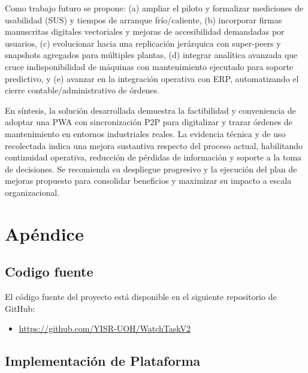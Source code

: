 \documentclass[10pt,a4paper]{report}
\begin{document}
Como trabajo futuro se propone: (a) ampliar el piloto y formalizar mediciones de usabilidad (SUS) y tiempos de arranque frío/caliente, (b) incorporar firmas manuscritas digitales vectoriales y mejoras de accesibilidad demandadas por usuarios, (c) evolucionar hacia una replicación jerárquica con super-peers y snapshots agregados para múltiples plantas, (d) integrar analítica avanzada que cruce indisponibilidad de máquinas con mantenimiento ejecutado para soporte predictivo, y (e) avanzar en la integración operativa con ERP, automatizando el cierre contable/administrativo de órdenes.

En síntesis, la solución desarrollada demuestra la factibilidad y conveniencia de adoptar una PWA con sincronización P2P para digitalizar y trazar órdenes de mantenimiento en entornos industriales reales. La evidencia técnica y de uso recolectada indica una mejora sustantiva respecto del proceso actual, habilitando continuidad operativa, reducción de pérdidas de información y soporte a la toma de decisiones. Se recomienda su despliegue progresivo y la ejecución del plan de mejoras propuesto para consolidar beneficios y maximizar su impacto a escala organizacional.


\appendix
\chapter*{Apéndice}
\section*{Codigo fuente}
El código fuente del proyecto está disponible en el siguiente repositorio de GitHub:
\begin{itemize}
    \item \url{https://github.com/YISR-UOH/WatchTaskV2}
\end{itemize}
\section*{Implementación de Plataforma}
\end{document}

